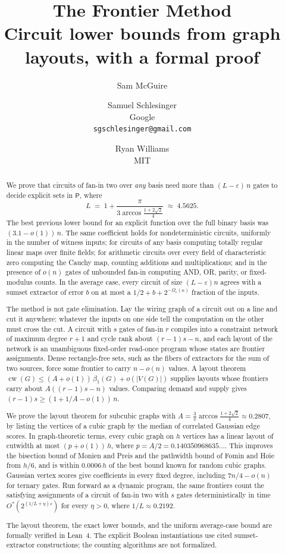 \documentclass[11pt]{article}
\title{The Frontier Method\\[0.4em]
\large Circuit lower bounds from graph layouts, with a formal proof}
\author{Sam McGuire
  \and Samuel Schlesinger\\[0.2em] \normalsize Google\\ \normalsize\texttt{sgschlesinger@gmail.com}
  \and Ryan Williams\\[0.2em] \normalsize MIT}
\date{}
\theoremstyle{plain}
\theoremstyle{definition}
\theoremstyle{remark}
\newcommand{\card}[1]{\lvert #1\rvert}
\DeclareMathOperator{\cw}{cw}
\begin{document}
\maketitle


\begin{abstract}
We prove that circuits of fan-in two over \emph{any} basis need more than
$(L - \varepsilon)\,n$ gates to decide explicit sets in $\mathsf{P}$, where
\[
  L \;=\; 1 + \frac{\pi}{3\arccos\frac{1+2\sqrt2}{4}} \;\approx\; 4.5625 .
\]
The best previous lower bound for an explicit function over the full binary basis was
$(3.1 - o(1))\,n$. The same coefficient holds for nondeterministic circuits, uniformly in the
number of witness inputs; for circuits of any basis computing totally regular linear maps over
finite fields; for arithmetic circuits over every field of characteristic zero computing the
Cauchy map, counting additions and multiplications; and in the presence of $o(n)$ gates of
unbounded fan-in computing AND, OR, parity, or fixed-modulus counts. In the average case, every
circuit of size $(L - \varepsilon)n$ agrees with a sumset extractor of error $b$ on at most a
$1/2 + b + 2^{-\Omega_\varepsilon(n)}$ fraction of the inputs.

The method is not gate elimination. Lay the wiring graph of a circuit out on a line and cut it
anywhere: whatever the inputs on one side tell the computation on the other must cross the cut.
A circuit with $s$ gates of fan-in $r$ compiles into a constraint network of maximum degree $r+1$
and cycle rank about $(r-1)s - n$, and each layout of the network is an unambiguous fixed-order
read-once program whose states are frontier assignments. Dense rectangle-free sets, such as the
fibers of extractors for the sum of two sources, force some frontier to carry $n - o(n)$ values.
A layout theorem $\cw(G) \le (A + o(1))\,\beta_1(G) + o(\card{V(G)})$ supplies layouts whose
frontiers carry about $A((r-1)s - n)$ values. Comparing demand and supply gives
$(r-1)s \ge (1 + 1/A - o(1))\,n$.

We prove the layout theorem for subcubic graphs with
$A = \frac{3}{\pi}\arccos\frac{1+2\sqrt2}{4} \approx 0.2807$, by listing the vertices of a cubic
graph by the median of correlated Gaussian edge scores. In graph-theoretic terms, every cubic
graph on $h$ vertices has a linear layout of cutwidth at most $(p + o(1))\,h$, where
$p=A/2=0.140350968635\ldots$. This improves
the bisection bound of Monien and Preis and the pathwidth bound of Fomin and H{\o}ie from $h/6$,
and is within $0.0006\,h$ of the best bound known for random cubic graphs. Gaussian vertex scores
give coefficients in every fixed degree, including $7n/4 - o(n)$ for ternary gates. Run forward
as a dynamic program, the same frontiers count the satisfying assignments of a circuit of fan-in
two with $s$ gates deterministically in time $O^*(2^{(1/L + \eta)s})$ for every $\eta > 0$, where
$1/L \approx 0.2192$.

The layout theorem, the exact lower bounds, and the uniform average-case bound are formally
verified in Lean~4. The explicit Boolean instantiations use cited sumset-extractor
constructions; the counting algorithms are not formalized.
\end{abstract}
\end{document}

